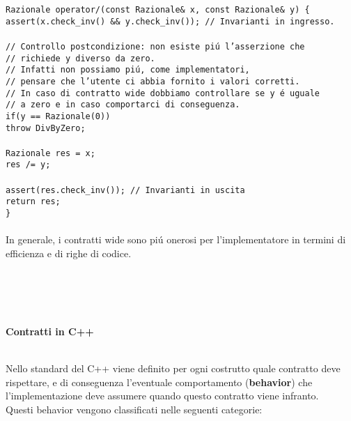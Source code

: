 \documentclass{article}
\newcommand\tab[1][1cm]{\hspace*{#1}}
\begin{document}
\texttt{Razionale operator/(const Razionale\& x, const Razionale\& y) \{ \\ \tab assert(x.check\_inv() \&\& y.check\_inv()); \textcolor{grigio}{// Invarianti in ingresso. \\ \\ \tab // Controllo postcondizione: non esiste pi\'u l'asserzione che \\ \tab // richiede y diverso da zero. \\ \tab // Infatti non possiamo pi\'u, come implementatori,\\ \tab // pensare che l'utente ci abbia fornito i valori corretti. \\ \tab // In caso di contratto wide dobbiamo controllare se y \'e uguale \\  \tab // a zero e in caso comportarci di conseguenza.  }\\ \tab if(y == Razionale(0)) \\ \tab \tab throw DivByZero;\\ \\ \tab Razionale res = x; \\ \tab res /= y; \\ \\ \tab assert(res.check\_inv()); \textcolor{grigio}{// Invarianti in uscita}\\ \tab return res; \\ \}  } \\ \\
In generale, i contratti wide sono pi\'u onerosi per l'implementatore in termini di efficienza e di righe di codice. 
\\ \\ \\ \\ \\
\begin{large}\textbf{\textcolor{blu}{Contratti in C++}} \\ \\ \end{large}
Nello standard del C++ viene definito per ogni costrutto quale contratto deve rispettare, e di conseguenza l'eventuale comportamento (\textbf{behavior}) che l'implementazione deve assumere quando questo contratto viene infranto.\\
Questi behavior vengono classificati nelle seguenti categorie: \\
\end{document}
